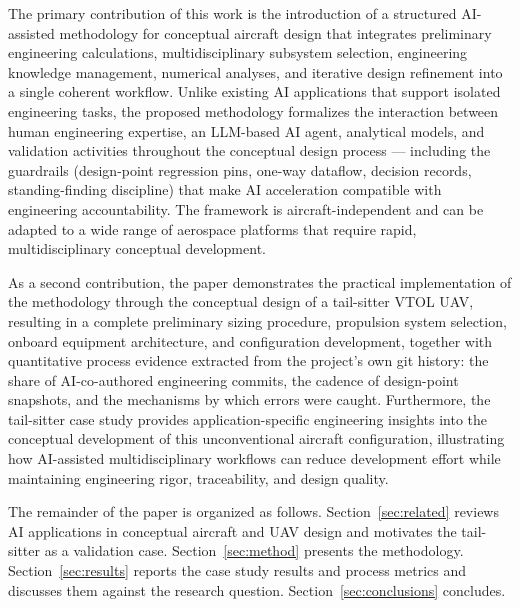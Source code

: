 The primary contribution of this work is the introduction of a
structured AI-assisted methodology for conceptual aircraft design that
integrates preliminary engineering calculations, multidisciplinary
subsystem selection, engineering knowledge management, numerical
analyses, and iterative design refinement into a single coherent
workflow. Unlike existing AI applications that support isolated
engineering tasks, the proposed methodology formalizes the interaction
between human engineering expertise, an LLM-based AI agent, analytical
models, and validation activities throughout the conceptual design
process --- including the guardrails (design-point regression pins,
one-way dataflow, decision records, standing-finding discipline) that
make AI acceleration compatible with engineering accountability. The
framework is aircraft-independent and can be adapted to a wide range of
aerospace platforms that require rapid, multidisciplinary conceptual
development.

As a second contribution, the paper demonstrates the practical
implementation of the methodology through the conceptual design of a
tail-sitter VTOL UAV, resulting in a complete preliminary sizing
procedure, propulsion system selection, onboard equipment architecture,
and configuration development, together with quantitative process
evidence extracted from the project's own git history: the share of
AI-co-authored engineering commits, the cadence of design-point
snapshots, and the mechanisms by which errors were caught. Furthermore,
the tail-sitter case study provides application-specific engineering
insights into the conceptual development of this unconventional
aircraft configuration, illustrating how AI-assisted multidisciplinary
workflows can reduce development effort while maintaining engineering
rigor, traceability, and design quality.

The remainder of the paper is organized as follows.
Section~\ref{sec:related} reviews AI applications in conceptual
aircraft and UAV design and motivates the tail-sitter as a validation
case. Section~\ref{sec:method} presents the methodology.
Section~\ref{sec:results} reports the case study results and process
metrics and discusses them against the research question.
Section~\ref{sec:conclusions} concludes.
